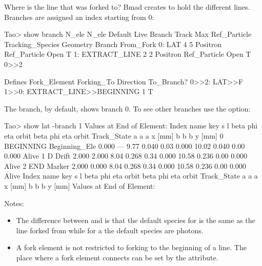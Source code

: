 \documentclass{hitec}
\begin{document}
Where is the line that was forked to? Bmad creates  to hold the different
lines. Branches are assigned an index starting from 0:

{\small
\begin{code}
Tao> show branch
                          N_ele  N_ele                  Default                       Live
  Branch                  Track    Max   Ref_Particle   Tracking_Species    Geometry  Branch  From_Fork
  0: LAT                      4      5   Positron       Ref_Particle        Open       T
  1: EXTRACT_LINE             2      2   Positron       Ref_Particle        Open       T      0>>2
 
                                                                                                      Defines
  Fork_Element                              Forking_To                                   Direction    To_Branch?
  0>>2: LAT>>F                              1>>0: EXTRACT_LINE>>BEGINNING                 1             T
\end{code}}  

The  branch, by default, shows branch 0. To see other branches use the  option:
{\small
\begin{code}
Tao> show lat -branch 1
      Values at End of Element:
 Index  name      key                       s       l    beta     phi    eta  orbit     beta     phi    eta  orbit    Track_State
                                                            a       a      a  x [mm]       b       b      b  y [mm]
     0  BEGINNING Beginning_Ele         0.000     ---    9.77   0.040   0.03   0.000   10.02   0.040   0.00   0.000   Alive
     1  D         Drift                 2.000   2.000    8.04   0.268   0.34   0.000   10.58   0.236   0.00   0.000   Alive
     2  END       Marker                2.000   0.000    8.04   0.268   0.34   0.000   10.58   0.236   0.00   0.000   Alive
 Index  name      key                       s       l    beta     phi    eta  orbit     beta     phi    eta  orbit    Track_State
                                                            a       a      a  x [mm]       b       b      b  y [mm]
      Values at End of Element:
\end{code}}

Notes:
\begin{itemize}
\item The difference between  and  is that the default species for  is
the same as the line forked from while for a  the default species are photons.
\item A fork element is not restricted to forking to the beginning of a line. 
The place where a fork element connects can be set by the  attribute.
\end{itemize}
\end{document}
